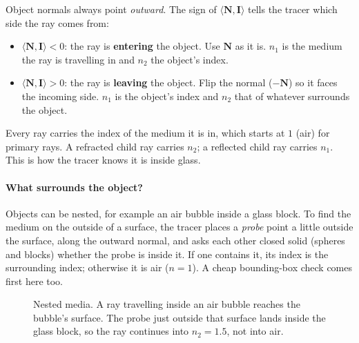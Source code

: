 \documentclass[11pt,a4paper]{article}
\newcommand{\vv}[1]{\mathbf{#1}}
\newcommand{\dotp}[2]{\langle #1, #2\rangle}
\begin{document}
Object normals always point \emph{outward}. The sign of $\dotp{\vv N}{\vv I}$
tells the tracer which side the ray comes from:

\begin{itemize}[leftmargin=1.4em]
  \item $\dotp{\vv N}{\vv I}<0$: the ray is \textbf{entering} the object. Use
        $\vv N$ as it is. $n_1$ is the medium the ray is travelling in and $n_2$
        the object's index.
  \item $\dotp{\vv N}{\vv I}>0$: the ray is \textbf{leaving} the object. Flip
        the normal ($-\vv N$) so it faces the incoming side. $n_1$ is the
        object's index and $n_2$ that of whatever surrounds the object.
\end{itemize}

Every ray carries the index of the medium it is in, which starts at $1$ (air)
for primary rays. A refracted child ray carries $n_2$; a reflected child ray
carries $n_1$. This is how the tracer knows it is inside glass.

\paragraph{What surrounds the object?} Objects can be nested, for example an air
bubble inside a glass block. To find the medium on the outside of a surface, the
tracer places a \emph{probe} point a little outside the surface, along the
outward normal, and asks each other closed solid (spheres and blocks) whether
the probe is inside it. If one contains it, its index is the surrounding index;
otherwise it is air ($n=1$). A cheap bounding-box check comes first here too.

\begin{figure}[h]
\centering
{}
\caption{Nested media. A ray travelling inside an air bubble reaches the
bubble's surface. The probe just outside that surface lands inside the glass
block, so the ray continues into $n_2=1.5$, not into air.}
\end{figure}
\end{document}
